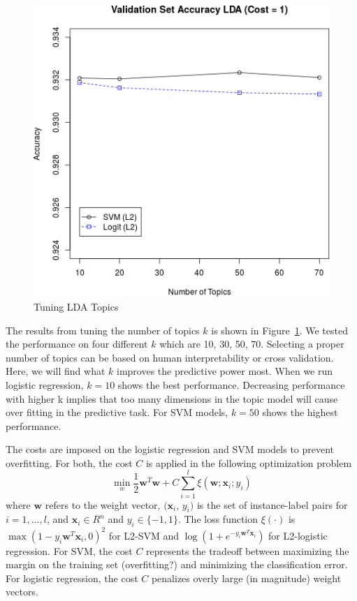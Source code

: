 \documentclass{sig-alternate-05-2015}
\begin{document}
\begin{figure}
  \centering
  \includegraphics[scale=0.5]{valid_k.png}
  \caption{Tuning LDA Topics}
  \label{fig:LDA}
\end{figure}
The results from tuning the number of topics $k$ is shown in Figure~\ref{fig:LDA}. We tested the performance on four different $k$ which are 10, 30, 50, 70. Selecting a proper number of topics can be based on human interpretability \cite{chang2009reading} or cross validation.  Here, we will find what $k$ improves the predictive power most. When we run logistic regression, $k=10$ shows the best performance. Decreasing performance with higher k implies that too many dimensions in the topic model will cause over fitting in the predictive task. For SVM models, $k=50$ shows the highest performance. 

The costs are imposed on the logistic regression and SVM models to prevent overfitting. For both, the cost $C$ is applied in the following optimization problem
\begin{equation}
  \label{eq:svm}
  \min_w \frac{1}{2} \mathbf{w}^T\mathbf{w} + C \sum_{i=1}^l \xi(\mathbf{w}; \mathbf{x}_i; y_i)
\end{equation}
where $\mathbf{w}$ refers to the weight vector, $(\mathbf{x}_i$, $y_i)$ is the set of instance-label pairs for $i=1, \ldots, l$, and $\mathbf{x}_i \in R^n$ and $y_i \in \{-1,1\}$. The loss function $\xi(\cdot)$ is $\max(1-y_i\mathbf{w}^T\mathbf{x}_i,0)^2$ for L2-SVM and $\log(1+e^{-y_i\mathbf{w}^T\mathbf{x}_i})$ for L2-logistic regression. For SVM, the cost $C$ represents the tradeoff between maximizing the margin on the training set (overfitting?) and minimizing the classification error. For logistic regression, the cost $C$ penalizes overly large (in magnitude) weight vectors.
\end{document}
